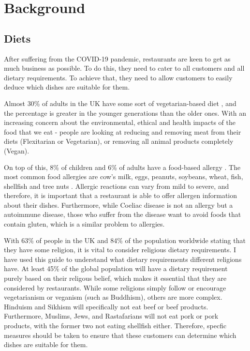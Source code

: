 \chapter{Background}

\section{Diets}

After suffering from the COVID-19 pandemic, restaurants are keen to get as much business as possible. To do this, they need to cater to all customers and all dietary requirements. To achieve that, they need to allow customers to easily deduce which dishes are suitable for them.

Almost 30\% of adults in the UK have some sort of vegetarian-based diet \cite{vege_2022}, and the percentage is greater in the younger generations than the older ones. With an increasing concern about the environmental, ethical and health impacts of the food that we eat - people are looking at reducing and removing meat from their diets (Flexitarian or Vegetarian), or removing all animal products completely (Vegan).

On top of this, 8\% of children and 6\% of adults have a food-based allergy \cite{sicherer_sampson_2017}. The most common food allergies are cow's milk, eggs, peanuts, soybeans, wheat, fish, shellfish and tree nuts \cite{allergies_west_2023}. Allergic reactions can vary from mild to severe, and therefore, it is important that a restaurant is able to offer allergen information about their dishes. Furthermore, while Coeliac disease is not an allergy but a autoimmune disease, those who suffer from the disease want to avoid foods that contain gluten, which is a similar problem to allergies.

With 63\% of people in the UK \cite{religion_ons_census_2021} and 84\% of the population worldwide \cite{hackett_grim_2012} stating that they have some religion, it is vital to consider religious dietary requirements. I have used this guide \cite{guidance_on_foods_for_religious_faiths_2009} to understand what dietary requirements different religions have. At least 45\% of the global population will have a dietary requirement purely based on their religous belief, which makes it essential that they are considered by restaurants. While some religions simply follow or encourage vegetarianism or veganism (such as Buddhism), others are more complex. Hinduism and Sikhism will specifically not eat beef or beef products. Furthermore, Muslims, Jews, and Rastafarians will not eat pork or pork products, with the former two not eating shellfish either. Therefore, specfic measures should be taken to ensure that these customers can determine which dishes are suitable for them.

